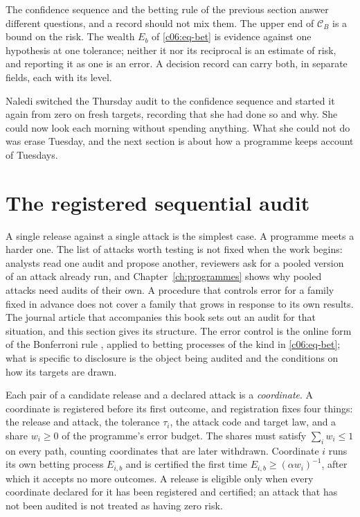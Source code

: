 The confidence sequence and the betting rule of the previous section answer
different questions, and a record should not mix them. The upper end of
$\mathcal{C}_B$ is a bound on the risk. The wealth $E_b$ of \eqref{c06:eq-bet} is
evidence against one hypothesis at one tolerance; neither it nor its reciprocal is
an estimate of risk, and reporting it as one is an error. A decision record can
carry both, in separate fields, each with its level.

Naledi switched the Thursday audit to the confidence sequence and started it again
from zero on fresh targets, recording that she had done so and why. She could now
look each morning without spending anything. What she could not do was erase
Tuesday, and the next section is about how a programme keeps account of Tuesdays.

\section{The registered sequential audit}\label{c06:sec-gate}

A single release against a single attack is the simplest case. A programme meets a
harder one. The list of attacks worth testing is not fixed when the work begins:
analysts read one audit and propose another, reviewers ask for a pooled version of
an attack already run, and Chapter~\ref{ch:programmes} shows why pooled attacks
need audits of their own. A procedure that controls error for a family fixed in
advance does not cover a family that grows in response to its own results. The
journal article that accompanies this book sets out an audit for that situation,
and this section gives its structure. The error control is the online form of the
Bonferroni rule \citep{foster2008,tian2021}, applied to betting processes of the
kind in \eqref{c06:eq-bet}; what is specific to disclosure is the object being
audited and the conditions on how its targets are drawn.

Each pair of a candidate release and a declared attack is a \emph{coordinate}. A
coordinate is registered before its first outcome, and registration fixes four
things: the release and attack, the tolerance $\tau_i$, the attack code and target
law, and a share $w_i \ge 0$ of the programme's error budget. The shares must
satisfy $\sum_i w_i \le 1$ on every path, counting coordinates that are later
withdrawn. Coordinate $i$ runs its own betting process $E_{i,b}$ and is certified the
first time $E_{i,b} \ge (\alpha w_i)^{-1}$, after which it accepts no more
outcomes. A release is eligible only when every coordinate declared for it has been
registered and certified; an attack that has not been audited is not treated as
having zero risk.

